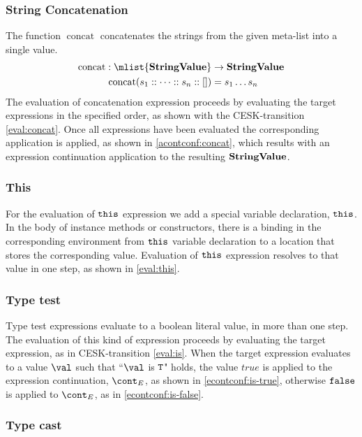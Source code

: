 \documentclass[a4paper,oneside]{article}
\DeclareMathOperator{\concat}{concat}
\begin{document}
\subsubsection{String Concatenation}
\label{subsubsec:string-concatenation}

The function $\concat$ concatenates the strings from the given meta-list into a single value.
\begin{align*}
  \concat : \mlist{\dstring} &\rightarrow \dstring\\
  \concat( s_1 :: \dots :: s_n :: []) &= s_1 \dots s_n
\end{align*}
The evaluation of concatenation expression proceeds by evaluating the target expressions in the specified order, as shown with the CESK-transition \eqref{eval:concat}.
Once all expressions have been evaluated the corresponding application is applied, as shown in \eqref{acontconf:concat}, which results with an expression continuation application to the resulting $\mathbf{StringValue}$.


\subsubsection{This}

For the evaluation of $\tt{this}$ expression we add a special variable declaration, $\tt{this}$.
In the body of instance methods or constructors, there is a binding in the corresponding environment from $\tt{this}$ variable declaration to a location that stores the corresponding value.
Evaluation of $\tt{this}$ expression resolves to that value in one step, as shown in \eqref{eval:this}.


\subsubsection{Type test}
\label{subsubsec:type-test}

Type test expressions evaluate to a boolean literal value, in more than one step.
The evaluation of this kind of expression proceeds by evaluating the target expression, as in CESK-transition \eqref{eval:is}.
When the target expression evaluates to a value $\val$ such that ``$\val $ is $\tt{T}$" holds, the value $true$ is applied to the expression continuation, $\econt$, as shown in \eqref{econtconf:is-true}, otherwise $\tt{false}$ is applied to $\econt$, as in \eqref{econtconf:is-false}.


\subsubsection{Type cast}
\label{subsubsec:type-cast}
\end{document}
